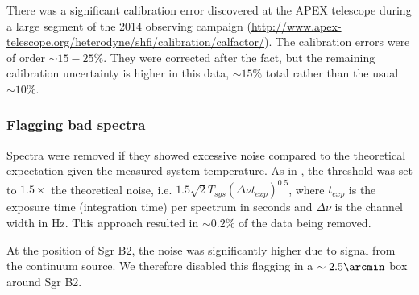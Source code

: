 There was a significant calibration error discovered at the APEX telescope during
a large segment of the 2014 observing campaign
(\url{http://www.apex-telescope.org/heterodyne/shfi/calibration/calfactor/}).
The calibration errors were of order $\sim15-25\%$.  They were corrected after
the fact, but the remaining calibration uncertainty
is higher in this data, $\sim15\%$ total rather than the usual $\sim10\%$.

\subsubsection{Flagging bad spectra}
Spectra were removed if they showed excessive noise compared to the
theoretical expectation given the measured system temperature.  As in
\citet{Ao2013a}, the threshold was set to $1.5\times$ the theoretical noise,
i.e. $1.5 \sqrt{2} T_{sys} (\Delta\nu t_{exp})^0.5$, where $t_{exp}$ is the
exposure time (integration time) per spectrum in seconds and $\Delta\nu$ is the
channel width in Hz.  This approach resulted in $\sim0.2\%$ of the data being
removed.  

At the position of Sgr B2, the noise was significantly higher due to signal
from the continuum source.  We therefore disabled this flagging in a
$\sim2.5\arcmin$ box around Sgr B2.



